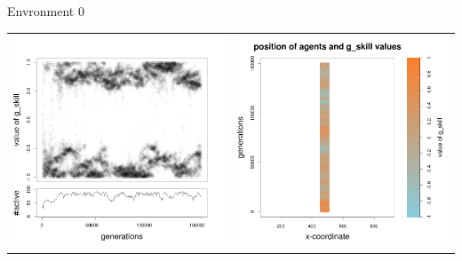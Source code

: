 \documentclass[8pt, handout=show,notes=show]{beamer}
\begin{document}
\begin{frame}{Envronment 0}
\begin{table}[H]
\begin{tabular}{cc}
 \newline
 \includegraphics[width=\imgSize]{../images/5StaticEnv/Gplot58_staticEnv0}&\includegraphics[width=\imgSize]{../images/5StaticEnv/Gplot58Static_staticEnv0}\\
\end{tabular}


\end{table}
\end{frame}
\end{document}
